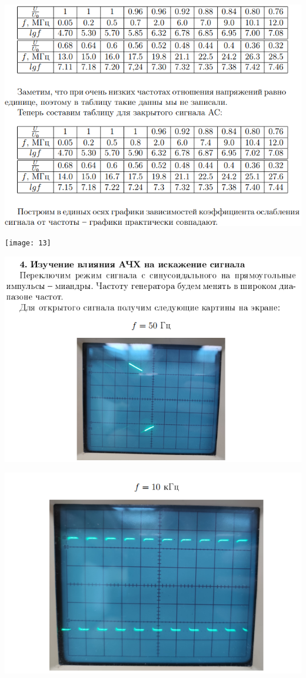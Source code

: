 \documentclass[a4paper,12pt]{article} %
\begin{document}
\begin{center}
\includegraphics{12}
\end{center}
\begin{center}
\texttt{[image: 13]}
\end{center}

\begin{center}
\includegraphics{14}
\end{center}

\begin{center}
\includegraphics{15}
\end{center}
\end{document}
